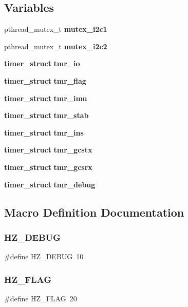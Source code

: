 \subsection*{Variables}
\begin{DoxyCompactItemize}
\item 
pthread\+\_\+mutex\+\_\+t \textbf{ mutex\+\_\+i2c1}
\item 
pthread\+\_\+mutex\+\_\+t \textbf{ mutex\+\_\+i2c2}
\item 
\textbf{ timer\+\_\+struct} \textbf{ tmr\+\_\+io}
\item 
\textbf{ timer\+\_\+struct} \textbf{ tmr\+\_\+flag}
\item 
\textbf{ timer\+\_\+struct} \textbf{ tmr\+\_\+imu}
\item 
\textbf{ timer\+\_\+struct} \textbf{ tmr\+\_\+stab}
\item 
\textbf{ timer\+\_\+struct} \textbf{ tmr\+\_\+ins}
\item 
\textbf{ timer\+\_\+struct} \textbf{ tmr\+\_\+gcstx}
\item 
\textbf{ timer\+\_\+struct} \textbf{ tmr\+\_\+gcsrx}
\item 
\textbf{ timer\+\_\+struct} \textbf{ tmr\+\_\+debug}
\end{DoxyCompactItemize}


\subsection{Macro Definition Documentation}
\mbox{\label{timer_8h_a85c123ce81e39125b05782a4c177edbd}} 
\subsubsection{H\+Z\+\_\+\+D\+E\+B\+UG}
{\footnotesize\ttfamily \#define H\+Z\+\_\+\+D\+E\+B\+UG~10}

\mbox{\label{timer_8h_a1b571f1f2c40b3b75217854ac3d05dd9}} 
\subsubsection{H\+Z\+\_\+\+F\+L\+AG}
{\footnotesize\ttfamily \#define H\+Z\+\_\+\+F\+L\+AG~20}

\mbox{\label{timer_8h_aaa03c666339189146b750be9a2c29c48}} 
